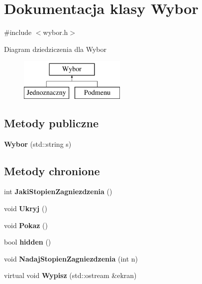 \hypertarget{classWybor}{\section{Dokumentacja klasy Wybor}
\label{classWybor}
}


{\ttfamily \#include $<$wybor.\-h$>$}

Diagram dziedziczenia dla Wybor\begin{figure}[H]
\begin{center}
\leavevmode
\includegraphics[height=2.000000cm]{classWybor}
\end{center}
\end{figure}
\subsection*{Metody publiczne}
\begin{DoxyCompactItemize}
\item 
\hypertarget{classWybor_a3e0c715881bdeeec7bbcb84531e3b0e5}{{\bfseries Wybor} (std\-::string s)}\label{classWybor_a3e0c715881bdeeec7bbcb84531e3b0e5}

\end{DoxyCompactItemize}
\subsection*{Metody chronione}
\begin{DoxyCompactItemize}
\item 
\hypertarget{classWybor_a78db78719c9fc86ad4c3a213397baf54}{int {\bfseries Jaki\-Stopien\-Zagniezdzenia} ()}\label{classWybor_a78db78719c9fc86ad4c3a213397baf54}

\item 
\hypertarget{classWybor_a67fe9d804ece1158b6b45d42875b05af}{void {\bfseries Ukryj} ()}\label{classWybor_a67fe9d804ece1158b6b45d42875b05af}

\item 
\hypertarget{classWybor_a22198d1190c37209a2db625a3e3b0fef}{void {\bfseries Pokaz} ()}\label{classWybor_a22198d1190c37209a2db625a3e3b0fef}

\item 
\hypertarget{classWybor_a76709c72cad50840901fcdb8ee365f1f}{bool {\bfseries hidden} ()}\label{classWybor_a76709c72cad50840901fcdb8ee365f1f}

\item 
\hypertarget{classWybor_a3257df3c35728ec264a51dce3ac28f55}{void {\bfseries Nadaj\-Stopien\-Zagniezdzenia} (int n)}\label{classWybor_a3257df3c35728ec264a51dce3ac28f55}

\item 
\hypertarget{classWybor_a42cb8cae1bafe052a3b96eddee87de62}{virtual void {\bfseries Wypisz} (std\-::ostream \&ekran)}\label{classWybor_a42cb8cae1bafe052a3b96eddee87de62}

\end{DoxyCompactItemize}
